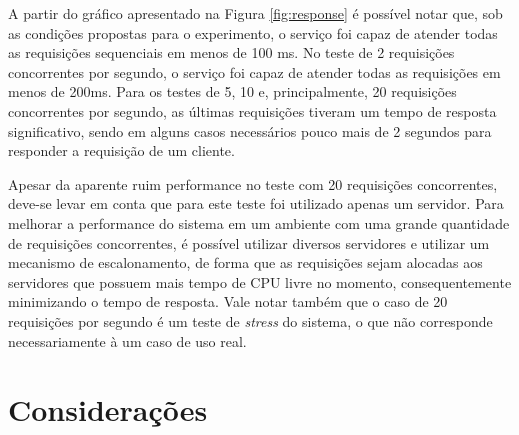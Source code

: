 A partir do gráfico apresentado na Figura \ref{fig:response} é possível notar que, sob as condições propostas para o experimento, o serviço foi capaz de atender todas as requisições sequenciais em menos de 100 ms.
No teste de 2 requisições concorrentes por segundo, o serviço foi capaz de atender todas as requisições em menos de 200ms.
Para os testes de 5, 10 e, principalmente, 20 requisições concorrentes por segundo, as últimas requisições tiveram um tempo de resposta significativo, sendo em alguns casos necessários pouco mais de 2 segundos para responder a requisição de um cliente.

Apesar da aparente ruim performance no teste com 20 requisições concorrentes, deve-se levar em conta que para este teste foi utilizado apenas um servidor.
Para melhorar a performance do sistema em um ambiente com uma grande quantidade de requisições concorrentes, é possível utilizar diversos servidores e utilizar um mecanismo de escalonamento, de forma que as requisições sejam alocadas aos servidores que possuem mais tempo de CPU livre no momento, consequentemente minimizando o tempo de resposta.
Vale notar também que o caso de 20 requisições por segundo é um teste de \emph{stress} do sistema, o que não corresponde necessariamente à um caso de uso real.

\section{Considerações}

